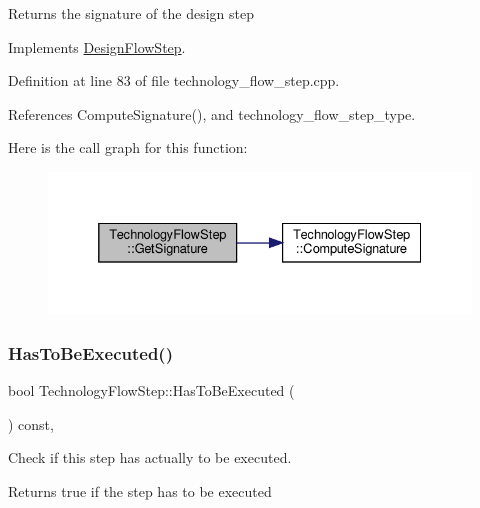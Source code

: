 \begin{DoxyReturn}{Returns}
the signature of the design step 
\end{DoxyReturn}


Implements \hyperlink{classDesignFlowStep_ab111e3d4058615c2dedc0505978d4699}{Design\+Flow\+Step}.



Definition at line 83 of file technology\+\_\+flow\+\_\+step.\+cpp.



References Compute\+Signature(), and technology\+\_\+flow\+\_\+step\+\_\+type.

Here is the call graph for this function\+:
\nopagebreak
\begin{figure}[H]
\begin{center}
\leavevmode
\includegraphics[width=332pt]{d9/deb/classTechnologyFlowStep_a56b1c17014e131852e07a52bceee38e0_cgraph}
\end{center}
\end{figure}
\mbox{\label{classTechnologyFlowStep_a615857428a91ec31e8b9f45cbdeeaa36}} 
\subsubsection{\texorpdfstring{Has\+To\+Be\+Executed()}{HasToBeExecuted()}}
{\footnotesize\ttfamily bool Technology\+Flow\+Step\+::\+Has\+To\+Be\+Executed (\begin{DoxyParamCaption}{ }\end{DoxyParamCaption}) const\hspace{0.3cm}{\ttfamily [override]}, {\ttfamily [virtual]}}



Check if this step has actually to be executed. 

\begin{DoxyReturn}{Returns}
true if the step has to be executed 
\end{DoxyReturn}


